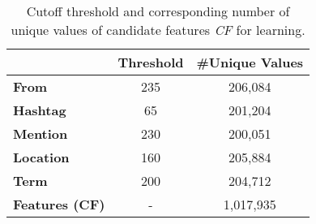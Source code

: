 \begin{table}[t!]
\vspace{-0.5mm}
\centering
\caption{Cutoff threshold and corresponding number of unique values of candidate features \textit{CF} for learning.}
{%
\def\arraystretch{1.2}
\begin{tabular}{|l|c|c|}
\hline
 & \textbf{Threshold} & \textbf{\#Unique Values} \\ \hline \hline
\textbf{From} & 235 &  206,084 \\ \hline
\textbf{Hashtag} & 65 & 201,204 \\ \hline
\textbf{Mention} & 230 & 200,051 \\ \hline
\textbf{Location} & 160 & 205,884 \\ \hline
\textbf{Term} & 200 & 204,712 \\ \hline
\hline
\textbf{Features (CF)} & - & 1,017,935 \\ \hline
\end{tabular}
}
\vspace{-1mm}
\label{table:learningFeatures}
\vspace{-1.5mm}
\end{table}





